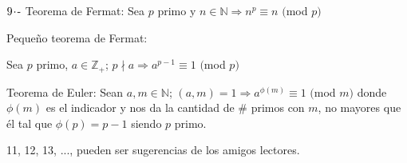 \vspace{0.5cm}

$9\hspace{-0.05cm}\cdot\hspace{-0.05cm}\text{-}$ Teorema de Fermat: Sea $p$ primo y $n \in \mathbb{N} \Longrightarrow n^p \equiv n$ $($mod $p)$

\hspace{0.7cm}Pequeño teorema de Fermat:

\hspace{0.9cm} Sea $p$ primo, $a \in \mathbb{Z}_+$; $p \nmid a \Longrightarrow a^{p-1} \equiv 1$ $($mod $p)$

\vspace{0.5cm}

\hspace{0.7cm}Teorema de Euler: Sean $a,m \in \mathbb{N}$; $(a,m) = 1 \Longrightarrow a^{\phi(m)} \equiv 1$ $($mod $m)$ donde $\phi(m)$ es el indicador y nos da la cantidad de \# primos con $m$, no mayores que él tal que $\phi(p) = p-1$ siendo $p$ primo.

\vspace{0.5cm}

\vspace{1cm}

11, 12, 13, ..., pueden ser sugerencias de los amigos lectores.
